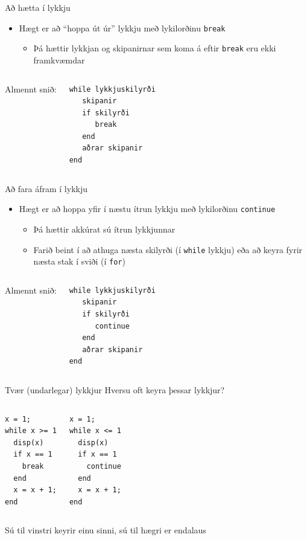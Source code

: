 \documentclass{beamer}
\begin{document}
\begin{frame}[fragile]{Að hætta í lykkju}
\vspace{\baselineskip}
\begin{itemize}
 \item Hægt er að ``hoppa út úr'' lykkju með lykilorðinu \texttt{break}
 \begin{itemize}
  \item Þá hættir lykkjan og skipanirnar sem koma á eftir \texttt{break} eru ekki framkvæmdar
 \end{itemize}
\end{itemize}
\begin{columns}
Almennt snið:
\begin{verbatim}
while lykkjuskilyrði
   skipanir
   if skilyrði
      break
   end
   aðrar skipanir
end
\end{verbatim}
\end{columns}
\end{frame}

\begin{frame}[fragile]{Að fara áfram í lykkju}
\vspace{1.5\baselineskip}
\begin{itemize}
 \item Hægt er að hoppa yfir í næstu ítrun lykkju með lykilorðinu \texttt{continue}
 \begin{itemize}
  \item Þá hættir akkúrat sú ítrun lykkjunnar
  \item Farið beint í að athuga næsta skilyrði (í \texttt{while} lykkju) eða að keyra fyrir næsta stak í sviði (í \texttt{for})
 \end{itemize}
\end{itemize}
\begin{columns}
Almennt snið:
\begin{verbatim}
while lykkjuskilyrði
   skipanir
   if skilyrði
      continue
   end
   aðrar skipanir
end
\end{verbatim}
\end{columns}
\end{frame}

\begin{frame}[fragile]{Tvær (undarlegar) lykkjur}
\vspace{\baselineskip}
Hversu oft keyra þessar lykkjur?
\begin{columns}
\begin{verbatim}
x = 1;
while x >= 1
  disp(x)
  if x == 1
    break
  end
  x = x + 1;
end
\end{verbatim}
\begin{verbatim}
x = 1;
while x <= 1
  disp(x)
  if x == 1
    continue
  end
  x = x + 1;
end
\end{verbatim}
\end{columns}
\pause Sú til vinstri keyrir einu sinni, sú til hægri er endalaus
\end{frame}
\end{document}

